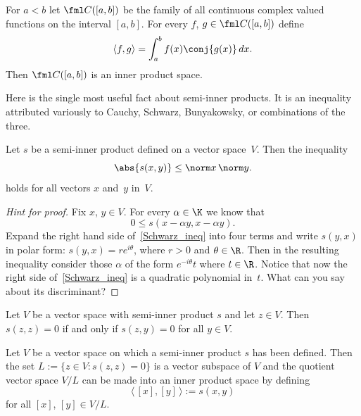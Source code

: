 \begin{exam}\label{000150014} For $a < b$ let $\fml C([a,b])$ be the family of all
continuous complex valued functions on the interval $[a,b]$.  For every $f$, $g \in \fml C([a,b])$ define
   \[ \langle f,g \rangle = \int_a^b f(x) \conj{g(x)}\,dx. \]
Then $\fml C([a,b])$ is an inner product space.
\end{exam}

Here is the single most useful fact about semi-inner products. It is an inequality attributed variously to Cauchy,
Schwarz, Bunyakowsky, or combinations of the three.

\begin{thm}\label{00015002} Let $s$ be a semi-inner product defined on a vector space~$V$.
Then the inequality
   \[ \abs{s(x,y)} \le \norm x \,\norm y. \]
holds for all vectors $x$ and~$y$ in~$V$.
\end{thm}

\begin{proof}[\emph{Hint for proof}] Fix $x$, $y \in V$.  For every $\alpha \in \K$ we know that
  \begin{equation}\label{Schwarz_ineq}
      0 \le s(x - \alpha y, x - \alpha y) .
  \end{equation}
Expand the right hand side of~\eqref{Schwarz_ineq} into four terms and write $s(y,x)$ in polar form: $s(y,x) = r e^{i\theta}$,
where $r > 0$ and $\theta \in \R$.  Then in the resulting inequality consider those $\alpha$ of the form $e^{-i\theta}t$ where
$t \in \R$.  Notice that now the right side of~\eqref{Schwarz_ineq} is a quadratic polynomial in~$t$.  What can you say about its
discriminant?  \ns
\end{proof}

\begin{prop} Let $V$ be a vector space with semi-inner product $s$ and let $z \in V$.  Then $s(z,z) = 0$
if and only if $s(z,y) = 0$ for all $y \in V$.
\end{prop}

\begin{prop} Let $V$ be a vector space on which a semi-inner product $s$ has been defined.  Then the set
$L := \{z \in V\colon s(z,z) = 0\}$ is a vector subspace of $V$ and the quotient vector space $V/L$ can be
made into an inner product space by defining
    \[ \langle\, [x],[y]\, \rangle := s(x,y) \]
for all $[x]$, $[y] \in V/L$.
\end{prop}

